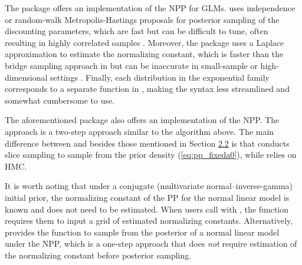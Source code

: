 The package  offers an implementation of the NPP for GLMs.  uses independence or random-walk Metropolis-Hastings proposals for posterior sampling of the discounting parameters, which are fast but can be difficult to tune, often resulting in highly correlated samples \citep{robertsOptimalScalingVarious2001}. Moreover, the  package uses a Laplace approximation \citep{tierney1986accurate} to estimate the normalizing constant, which is faster than the bridge sampling approach in  but can be inaccurate in small-sample or high-dimensional settings \citep{shunLaplaceApproximationHigh1995}. Finally, each distribution in the exponential family corresponds to a separate function in , making the syntax less streamlined and somewhat cumbersome to use. 

The aforementioned  package also offers an implementation of the NPP. The approach is a two-step approach similar to the algorithm above. The main difference between  and  besides those mentioned in Section \hyperref[sec:pp]{2.2} is that  conducts slice sampling to sample from the prior density (\ref{eq:pp_fixeda0}), while  relies on HMC. 

It is worth noting that under a conjugate (multivariate normal–inverse-gamma) initial prior, the normalizing constant of the PP for the normal linear model is known and does not need to be estimated.
When users call  with , the function requires them to input a grid of estimated normalizing constants. Alternatively,  provides the  function to sample from the posterior of a normal linear model under the NPP, which is a one-step approach that does \emph{not} require estimation of the normalizing constant before posterior sampling.

